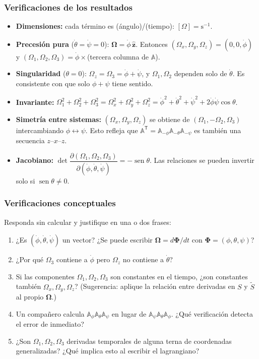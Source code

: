 \documentclass[spanish]{beamer}
\providecommand{\sen}{\operatorname{sen}}       %
\newcommand{\uv}[1]{\hat{\mathbf{#1}}}          %
\newcommand{\bOmega}{\bm{\Omega}}               %
\newcommand{\Rot}{\mathbb{A}}                   %
\newcommand{\Slab}{S}                           %
\newcommand{\Scue}{\tilde{S}}                   %
\newcommand{\tr}{\mathsf{T}}                    %
\begin{document}
\begin{frame}
  \frametitle{Verificaciones de los resultados}
  \begin{itemize}
    \item<1-> \textbf{Dimensiones:} cada término es (ángulo)/(tiempo):
          $[\Omega]=\mathrm{s}^{-1}$.
    \item<2-> \textbf{Precesión pura} ($\dot\theta=\dot\psi=0$): $\bOmega=\dot\phi\,\uv{z}$.
          Entonces $(\Omega_x,\Omega_y,\Omega_z)=(0,0,\dot\phi)$ y
          $(\Omega_1,\Omega_2,\Omega_3)=\dot\phi\times$(tercera columna de $\Rot$).
    \item<3-> \textbf{Singularidad} ($\theta=0$): $\Omega_z=\Omega_3=\dot\phi+\dot\psi$, y
          $\Omega_1,\Omega_2$ dependen solo de $\dot\theta$.
          Es consistente con que solo $\phi+\psi$ tiene sentido.
    \item<4-> \textbf{Invariante:} $\Omega_1^2+\Omega_2^2+\Omega_3^2=\Omega_x^2+\Omega_y^2+\Omega_z^2
          =\dot\phi^2+\dot\theta^2+\dot\psi^2+2\dot\phi\dot\psi\cos\theta$.
    \item<5-> \textbf{Simetría entre sistemas:} $(\Omega_x,\Omega_y,\Omega_z)$ se obtiene de
          $(\Omega_1,-\Omega_2,\Omega_3)$ intercambiando $\phi\leftrightarrow\psi$.
          Esto refleja que $\Rot^{\tr}=\Rot_{-\phi}\Rot_{-\theta}\Rot_{-\psi}$
          es también una secuencia $z$–$x$–$z$.
    \item<6-> \textbf{Jacobiano:}
          $\det\dfrac{\partial(\Omega_1,\Omega_2,\Omega_3)}{\partial(\dot\phi,\dot\theta,\dot\psi)}=-\sen\theta$.
          Las relaciones se pueden invertir solo si $\sen\theta\neq0$.
  \end{itemize}
\end{frame}

\begin{frame}
  \frametitle{Verificaciones conceptuales}
  Responda sin calcular y justifique en una o dos frases:
  \begin{enumerate}
    \item<1-> ¿Es $(\dot\phi,\dot\theta,\dot\psi)$ un vector? ¿Se puede escribir
          $\bOmega=d\bm{\Phi}/dt$ con $\bm{\Phi}=(\phi,\theta,\psi)$?
    \item<2-> ¿Por qué $\Omega_3$ contiene a $\dot\phi$ pero $\Omega_z$ no contiene a
          $\dot\theta$?
    \item<3-> Si las componentes $\Omega_1,\Omega_2,\Omega_3$ son constantes en el tiempo,
          ¿son constantes también $\Omega_x,\Omega_y,\Omega_z$?
          (Sugerencia: aplique la relación entre derivadas en $\Slab$ y $\Scue$ al
          propio $\bOmega$.)
    \item<4-> Un compañero calcula $\Rot_\phi\Rot_\theta\Rot_\psi$ en lugar de
          $\Rot_\psi\Rot_\theta\Rot_\phi$. ¿Qué verificación
          detecta el error de inmediato?
    \item<5-> ¿Son $\Omega_1,\Omega_2,\Omega_3$ derivadas temporales de alguna terna de
          coordenadas generalizadas? ¿Qué implica esto al escribir el lagrangiano?
  \end{enumerate}
\end{frame}
\end{document}
